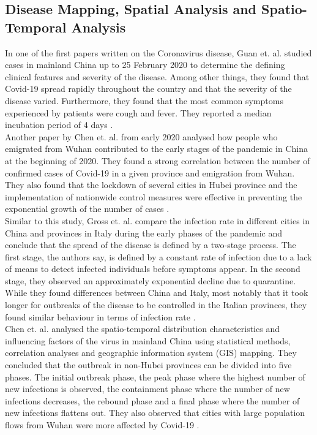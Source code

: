 \subsection*{Disease Mapping, Spatial Analysis and Spatio-Temporal Analysis}
In one of the first papers written on the Coronavirus disease, Guan et. al. studied cases in mainland China up to 25 February 2020 to determine the defining clinical features and severity of the disease. Among other things, they found that Covid-19 spread rapidly throughout the country and that the severity of the disease varied. Furthermore, they found that the most common symptoms experienced by patients were cough and fever. They reported a median incubation period of 4 days \autocite[][]{guan2020clinical}. \\
Another paper by Chen et. al. from early 2020 analysed how people who emigrated from Wuhan contributed to the early stages of the pandemic in China at the beginning of 2020. They found a strong correlation between the number of confirmed cases of Covid-19 in a given province and emigration from Wuhan. They also found that the lockdown of several cities in Hubei province and the implementation of nationwide control measures were effective in preventing the exponential growth of the number of cases \autocite[][]{chen2020distribution}. \\
Similar to this study, Gross et. al. compare the infection rate in different cities in China and provinces in Italy during the early phases of the pandemic and conclude that the spread of the disease is defined by a two-stage process. The first stage, the authors say, is defined by a constant rate of infection due to a lack of means to detect infected individuals before symptoms appear. In the second stage, they observed an approximately exponential decline due to quarantine. While they found differences between China and Italy, most notably that it took longer for outbreaks of the disease to be controlled in the Italian provinces, they found similar behaviour in terms of infection rate \autocite[][]{gross2020spatio}. \\
Chen et. al. analysed the spatio-temporal distribution characteristics and influencing factors of the virus in mainland China using statistical methods, correlation analyses and geographic information system (GIS) mapping. They concluded that the outbreak in non-Hubei provinces can be divided into five phases. The initial outbreak phase, the peak phase where the highest number of new infections is observed, the containment phase where the number of new infections decreases, the rebound phase and a final phase where the number of new infections flattens out. They also observed that cities with large population flows from Wuhan were more affected by Covid-19 \autocite[][]{chen2021spatio}.
